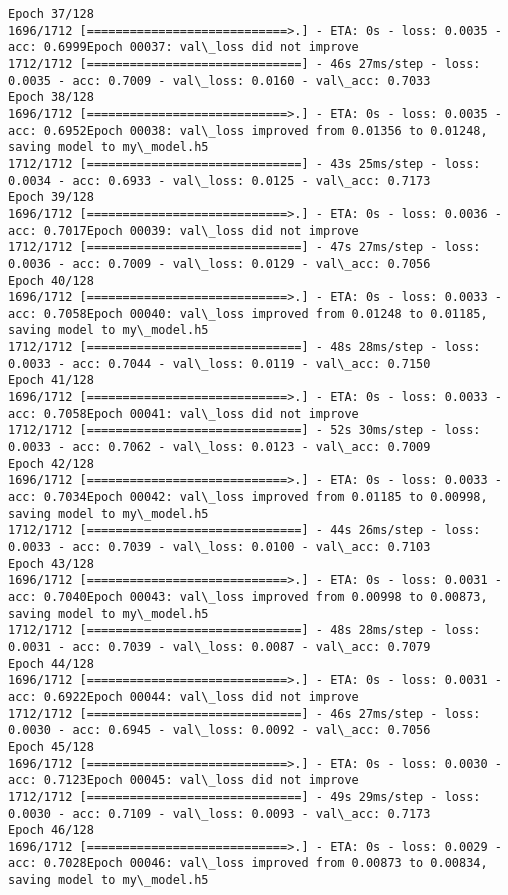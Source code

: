 \documentclass[11pt]{article}
\begin{document}
\begin{Verbatim}[commandchars=\\\{\}]
Epoch 37/128
1696/1712 [============================>.] - ETA: 0s - loss: 0.0035 - acc: 0.6999Epoch 00037: val\_loss did not improve
1712/1712 [==============================] - 46s 27ms/step - loss: 0.0035 - acc: 0.7009 - val\_loss: 0.0160 - val\_acc: 0.7033
Epoch 38/128
1696/1712 [============================>.] - ETA: 0s - loss: 0.0035 - acc: 0.6952Epoch 00038: val\_loss improved from 0.01356 to 0.01248, saving model to my\_model.h5
1712/1712 [==============================] - 43s 25ms/step - loss: 0.0034 - acc: 0.6933 - val\_loss: 0.0125 - val\_acc: 0.7173
Epoch 39/128
1696/1712 [============================>.] - ETA: 0s - loss: 0.0036 - acc: 0.7017Epoch 00039: val\_loss did not improve
1712/1712 [==============================] - 47s 27ms/step - loss: 0.0036 - acc: 0.7009 - val\_loss: 0.0129 - val\_acc: 0.7056
Epoch 40/128
1696/1712 [============================>.] - ETA: 0s - loss: 0.0033 - acc: 0.7058Epoch 00040: val\_loss improved from 0.01248 to 0.01185, saving model to my\_model.h5
1712/1712 [==============================] - 48s 28ms/step - loss: 0.0033 - acc: 0.7044 - val\_loss: 0.0119 - val\_acc: 0.7150
Epoch 41/128
1696/1712 [============================>.] - ETA: 0s - loss: 0.0033 - acc: 0.7058Epoch 00041: val\_loss did not improve
1712/1712 [==============================] - 52s 30ms/step - loss: 0.0033 - acc: 0.7062 - val\_loss: 0.0123 - val\_acc: 0.7009
Epoch 42/128
1696/1712 [============================>.] - ETA: 0s - loss: 0.0033 - acc: 0.7034Epoch 00042: val\_loss improved from 0.01185 to 0.00998, saving model to my\_model.h5
1712/1712 [==============================] - 44s 26ms/step - loss: 0.0033 - acc: 0.7039 - val\_loss: 0.0100 - val\_acc: 0.7103
Epoch 43/128
1696/1712 [============================>.] - ETA: 0s - loss: 0.0031 - acc: 0.7040Epoch 00043: val\_loss improved from 0.00998 to 0.00873, saving model to my\_model.h5
1712/1712 [==============================] - 48s 28ms/step - loss: 0.0031 - acc: 0.7039 - val\_loss: 0.0087 - val\_acc: 0.7079
Epoch 44/128
1696/1712 [============================>.] - ETA: 0s - loss: 0.0031 - acc: 0.6922Epoch 00044: val\_loss did not improve
1712/1712 [==============================] - 46s 27ms/step - loss: 0.0030 - acc: 0.6945 - val\_loss: 0.0092 - val\_acc: 0.7056
Epoch 45/128
1696/1712 [============================>.] - ETA: 0s - loss: 0.0030 - acc: 0.7123Epoch 00045: val\_loss did not improve
1712/1712 [==============================] - 49s 29ms/step - loss: 0.0030 - acc: 0.7109 - val\_loss: 0.0093 - val\_acc: 0.7173
Epoch 46/128
1696/1712 [============================>.] - ETA: 0s - loss: 0.0029 - acc: 0.7028Epoch 00046: val\_loss improved from 0.00873 to 0.00834, saving model to my\_model.h5

\end{Verbatim}
\end{document}
